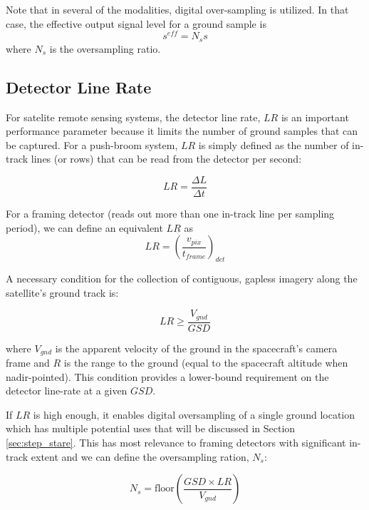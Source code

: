 \documentclass[10pt,journal]{IEEEtran}  %
\begin{document}
Note that in several of the modalities, digital over-sampling is utilized.  In that case, the effective output signal level for a ground sample is 
$$s^{eff} = N_s s$$
where $N_s$ is the oversampling ratio.


\subsection{Detector Line Rate}
For satelite remote sensing systems, the detector line rate, $LR$ is an important performance parameter because it limits the number of ground samples that can be captured.  For a push-broom system, $LR$ is simply defined as the number of in-track lines (or rows) that can be read from the detector per second:

$$LR = \frac{\Delta L}{\Delta t}$$

For a framing detector (reads out more than one in-track line per sampling period), we can define an equivalent $LR$ as
\begin{equation}
\label{eq:lr_framing}    
LR = \left(\frac{v_{pix}}{t_{frame}}\right)_{det}
\end{equation}

A necessary condition for the collection of contiguous, gapless imagery along the satellite's ground track is:

\begin{equation}
    LR \geq\frac{V_{gnd}}{GSD}
\end{equation}

where $V_{gnd}$ is the apparent velocity of the ground in the spacecraft's camera frame and $R$ is the range to the ground (equal to the spacecraft altitude when nadir-pointed).  This condition provides a lower-bound requirement on the detector line-rate at a given $GSD$.  

If $LR$ is high enough, it enables digital oversampling of a single ground location which has multiple potential uses that will be discussed in Section \ref{sec:step_stare}.  This has most relevance to framing detectors with significant in-track extent and we can define the oversampling ration, $N_s$:

\begin{equation}
    N_s = \text{floor}\left(\frac{GSD \times LR}{V_{gnd}}\right)
\end{equation}



\end{document}
